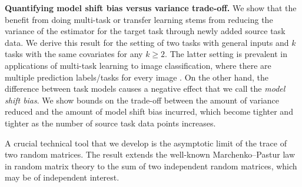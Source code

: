 
{\bf Quantifying model shift bias versus variance trade-off.}
	We show that the benefit from doing multi-task or transfer learning stems from reducing the variance of the estimator for the target task through newly added source task data.
	We derive this result for the setting of two tasks with general inputs and $k$ tasks with the same covariates for any $k \ge 2$.
	The latter setting is prevalent in applications of multi-task learning to image classification, where there are multiple prediction labels/tasks for every image \cite{EA20}.
	On the other hand, the difference between task models causes a negative effect that we call the \textit{model shift bias}.
	We show bounds on the trade-off between the amount of variance reduced and the amount of model shift bias incurred, which become tighter and tighter as the number of source task data points increases.

	A crucial technical tool that we develop is the asymptotic limit of the trace of two random matrices.
	The result extends the well-known Marchenko–Pastur law in random matrix theory to the sum of two independent random matrices, which may be of independent interest.


